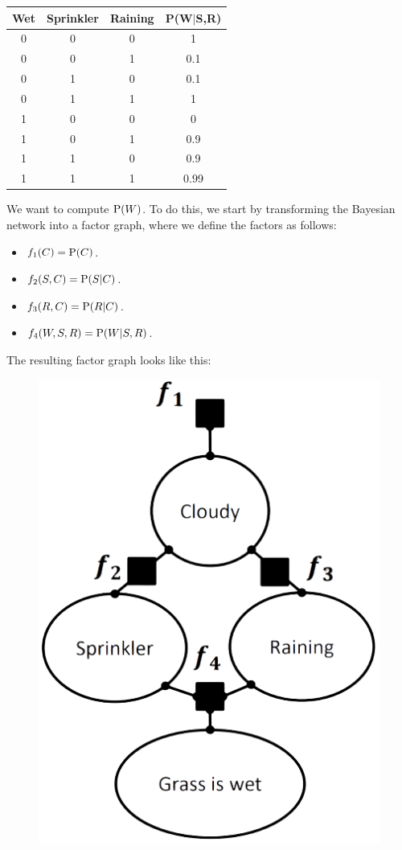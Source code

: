 \begin{example}
\begin{table}[H]
\begin{tabular}{ccc}
        \end{tabular}
    \end{table}
    \begin{table}[H]
        \centering
        \begin{tabular}{cccc}
        \hline
        \textbf{Wet} & \textbf{Sprinkler} & \textbf{Raining} & \textbf{P(W$|$S,R)} \\ \hline
        0            & 0                  & 0                & 1                   \\
        0            & 0                  & 1                & 0.1                 \\
        0            & 1                  & 0                & 0.1                 \\
        0            & 1                  & 1                & 1                   \\
        1            & 0                  & 0                & 0                   \\
        1            & 0                  & 1                & 0.9                 \\
        1            & 1                  & 0                & 0.9                 \\
        1            & 1                  & 1                & 0.99                \\ \hline
        \end{tabular}
    \end{table}
    We want to compute $\textnormal{P}(W)$. To do this, we start by transforming the Bayesian network into a factor graph, where we define the factors as follows:
    \begin{itemize}
        \item $f_1(C)=\textnormal{P}(C)$.
        \item $f_2(S,C)=\textnormal{P}(S|C)$.
        \item $f_3(R,C)=\textnormal{P}(R|C)$.
        \item $f_4(W,S,R)=\textnormal{P}(W|S,R)$.
    \end{itemize}
    The resulting factor graph looks like this:
    \begin{figure}[H]
        \centering
        \includegraphics[width=0.25\linewidth]{images/sprinklerfg.png}

\end{figure}
\end{example}
